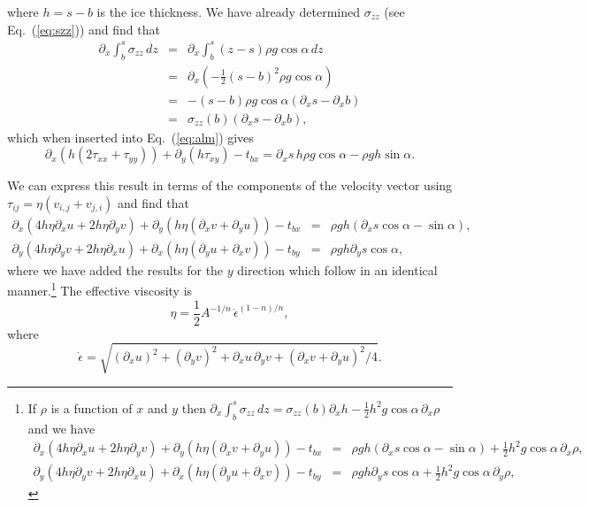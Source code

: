 \documentclass[10pt,a4paper]{book}
\newcommand{\p}{\partial}
\newcommand{\tij}{\tau_{ij}}
\newcommand{\txx}{\tau_{xx}}
\newcommand{\tyy}{\tau_{yy}}
\newcommand{\txy}{\tau_{xy}}
\newcommand{\szz}{\sigma_{zz}}
\begin{document}
where $h=s-b$ is the ice thickness.  We have already determined $\szz$
(see Eq.~(\ref{eq:szz})) and find that
\begin{eqnarray*}
\p_x \int_{b}^{s} \szz \, dz 
&=& \p_x \int_{b}^{s} (z-s) \rho g \cos \alpha \, dz \\
&=& \p_x \left (-\frac{1}{2}(s-b)^2 \rho g \cos \alpha \right ) \\
&=& -(s-b) \rho g \cos \alpha (\p_x s-\p_x b) \\
&=&\szz(b) (\p_x s-\p_x b) ,
\end{eqnarray*}
which when inserted into Eq.~(\ref{eq:alm}) gives
\[
\p_x (h (2\txx+\tyy)) + \p_y(h\txy)-t_{bx}
= \p_x s \,h \rho g \cos \alpha-\rho g h \sin \alpha .
\]


We can express this result in terms of the components of the velocity
vector using $\tij=\eta (v_{i,j}+v_{j,i})$ and find that
\begin{eqnarray} 
\p_x ( 4 h \eta \p_x u + 2 h \eta \p_y v) +\p_y ( h \eta (\p_x v + \p_y u)) - t_{bx}
&=&\rho g h (\p_x s \cos \alpha  -  \sin \alpha ),\\
\p_y ( 4 h \eta \p_y v + 2 h \eta \p_x u) +\p_x ( h \eta (\p_y u + \p_x v)) - t_{by}
&=&\rho g h \p_y s \cos \alpha  ,
\end{eqnarray}
where we have added the results for the $y$ direction which follow in an identical manner.\footnote{
If $\rho$ is a function of $x$ and $y$ then $\p_x \int_{b}^{s} \szz \, dz=\szz(b) \p_x h -\frac{1}{2} h^2 g \cos \alpha\, \p_x \rho$ and we have
\begin{eqnarray} 
\p_x ( 4 h \eta \p_x u + 2 h \eta \p_y v) +\p_y ( h \eta (\p_x v + \p_y u)) - t_{bx}
&=&\rho g h (\p_x s \cos \alpha  -  \sin \alpha )+\frac{1}{2} h^2 g \cos \alpha \, \p_x \rho,\\
\p_y ( 4 h \eta \p_y v + 2 h \eta \p_x u) +\p_x ( h \eta (\p_y u + \p_x v)) - t_{by}
&=&\rho g h \p_y s \cos \alpha  +\frac{1}{2} h^2 g \cos \alpha \, \p_y \rho,
\end{eqnarray}
}
The effective viscosity is 
\[
\eta=\frac{1}{2} A^{-1/n} \,\dot{\epsilon}^{(1-n)/n} ,
\]
where
\[ 
\dot{\epsilon}=\sqrt{ (\p_{x} u)^2 + (\p_{y} v)^2 +
\p_{x} u \,\p_{y} v + (\p_{x} v + \p_{y} u)^2/4}.
\]
\end{document}
